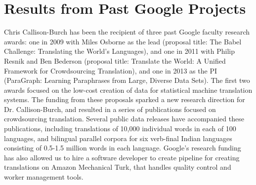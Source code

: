 \documentclass[11pt]{article}
\begin{document}
\section{Results from Past Google Projects}

Chris Callison-Burch has been the recipient of three past Google faculty
research awards: one in 2009 with Miles Osborne as the lead (proposal
title: The Babel Challenge: Translating the World's Languages), and
one in 2011 with Philip Resnik and Ben Bederson (proposal title:
Translate the World: A Unified Framework for Crowdsourcing
Translation), and one in 2013 as the PI (ParaGraph: Learning Paraphrases from Large, Diverse Data
  Sets).  The first two awards focused on the low-cost creation of data for
statistical machine translation systems.  The funding from these
proposals sparked a new research direction for Dr. Callison-Burch, and
resulted in a series of publications focused on crowdsourcing
translation.
Several public data releases have accompanied these publications,
including translations of 10,000 individual words in each of 100
languages, and bilingual parallel corpora for six verb-final Indian
languages consisting of 0.5-1.5 million words in each language.
Google's research funding has also allowed us to hire a software
developer to create pipeline for creating translations on Amazon
Mechanical Turk, that handles quality control and worker management
tools. 





\end{document}
